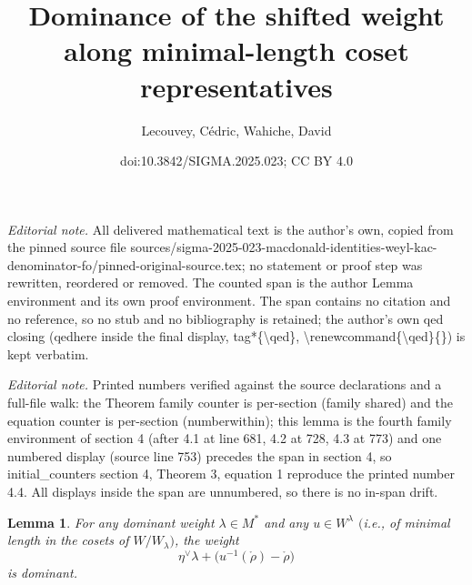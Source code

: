 \documentclass[10pt,a4paper]{article}
\title{Dominance of the shifted weight along minimal-length coset representatives}
\author{Lecouvey, Cédric, Wahiche, David}
\date{doi:10.3842/SIGMA.2025.023; CC BY 4.0}
\numberwithin{equation}{section}
\newtheorem{Lemma}[Theorem]{Lemma}
\begin{document}
\maketitle
\setcounter{section}{4}
\setcounter{Theorem}{3}
\setcounter{equation}{1}
\noindent\textit{Editorial note.} All delivered mathematical text is the author's own, copied from the pinned source file sources/sigma-2025-023-macdonald-identities-weyl-kac-denominator-fo/pinned-original-source.tex; no statement or proof step was rewritten, reordered or removed. The counted span is the author Lemma environment and its own proof environment. The span contains no citation and no reference, so no stub and no bibliography is retained; the author's own qed closing (qedhere inside the final display, tag*\{\textbackslash{}qed\}, \textbackslash{}renewcommand\{\textbackslash{}qed\}\{\}) is kept verbatim.\par\medskip
\noindent\textit{Editorial note.} Printed numbers verified against the source declarations and a full-file walk: the Theorem family counter is per-section (family shared) and the equation counter is per-section (numberwithin); this lemma is the fourth family environment of section 4 (after 4.1 at line 681, 4.2 at 728, 4.3 at 773) and one numbered display (source line 753) precedes the span in section 4, so initial\_counters section 4, Theorem 3, equation 1 reproduce the printed number 4.4. All displays inside the span are unnumbered, so there is no in-span drift.\par\medskip
\begin{Lemma}
	For any dominant weight $\lambda\in M^{\ast}$ and any $u\in W^{\lambda}$
	$($i.e., of minimal length in the cosets of $W/W_{\lambda})$, the weight
	\[
	\eta^{\vee}\lambda+\bigl(u^{-1}(\mathring{\rho})-\mathring{\rho}\bigr)
	\]
	is dominant.
\end{Lemma}
\end{document}
